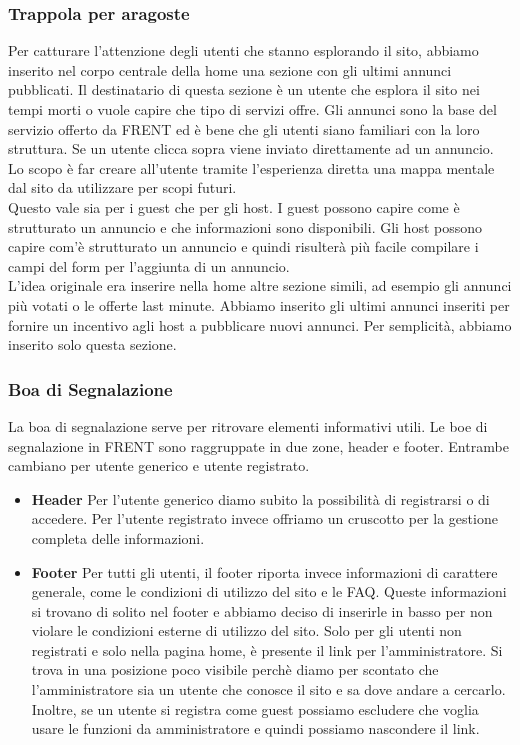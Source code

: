\documentclass[1_relazione.tex]{subfiles}
\begin{document}
\subsubsection{Trappola per aragoste} 
Per catturare l'attenzione degli utenti che stanno esplorando il sito, abbiamo inserito nel corpo centrale della home una sezione con gli ultimi annunci pubblicati. Il destinatario di questa sezione è un utente che esplora il sito nei tempi morti o vuole capire che tipo di servizi offre. Gli annunci sono la base del servizio offerto da FRENT ed è bene che gli utenti siano familiari con la loro struttura. Se un utente clicca sopra viene inviato direttamente ad un annuncio. Lo scopo è far creare all'utente tramite l'esperienza diretta una mappa mentale dal sito da utilizzare per scopi futuri. \\
Questo vale sia per i guest che per gli host. I guest possono capire come è strutturato un annuncio e che informazioni sono disponibili. Gli host possono capire com'è strutturato un annuncio e quindi risulterà più facile compilare i campi del form per l'aggiunta di un annuncio. \\
L'idea originale era inserire nella home altre sezione simili, ad esempio gli annunci più votati o le offerte last minute. Abbiamo inserito gli ultimi annunci inseriti per fornire un incentivo agli host a pubblicare nuovi annunci. Per semplicità, abbiamo inserito solo questa sezione. \\

\subsubsection{Boa di Segnalazione}
La boa di segnalazione serve per ritrovare elementi informativi utili. Le boe di segnalazione in FRENT sono raggruppate in due zone, header e footer. Entrambe cambiano per utente generico e utente registrato.

\begin{itemize}
\item \textbf{Header}
Per l'utente generico diamo subito la possibilità di registrarsi o di accedere. Per l'utente registrato invece offriamo un cruscotto per la gestione completa delle informazioni. 
\item \textbf{Footer}
Per tutti gli utenti, il footer riporta invece informazioni di carattere generale, come le condizioni di utilizzo del sito e le FAQ. Queste informazioni si trovano di solito nel footer e abbiamo deciso di inserirle in basso per non violare le condizioni esterne di utilizzo del sito.  Solo per gli utenti non registrati e solo nella pagina home, è presente il link per l'amministratore. Si trova in una posizione poco visibile perchè diamo per scontato che l'amministratore sia un utente che conosce il sito e sa dove andare a cercarlo. Inoltre, se un utente si registra come guest possiamo escludere che voglia usare le funzioni da amministratore e quindi possiamo nascondere il link. 
\end{itemize}
\end{document}
